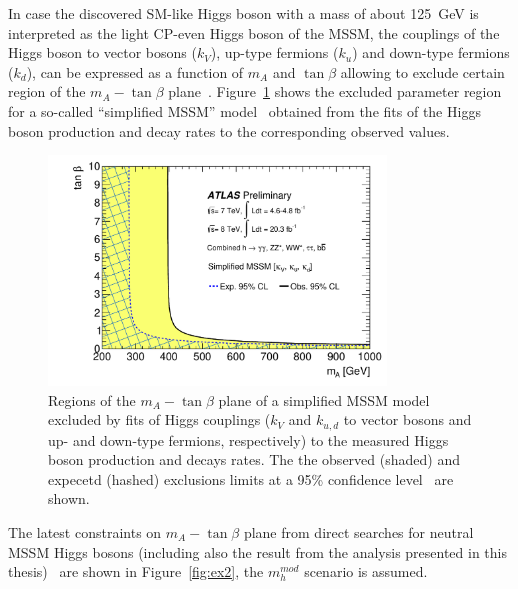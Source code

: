 In case the discovered SM-like Higgs boson with a mass of about 125~GeV is interpreted as the light CP-even Higgs boson of the MSSM, the couplings of the Higgs boson 
to vector bosons ($k_V$), up-type fermions ($k_u$) and down-type fermions ($k_d$), can be expressed as a function of  $m_A $ and $\tan\beta$
allowing to exclude certain region of the  $m_A - \tan\beta$ plane~\cite{AtlasConstraint}. Figure~\ref{fig:ex1} shows the 
excluded parameter region for a so-called ``simplified MSSM'' model~\cite{sympleMSSM1,sympleMSSM2}
obtained from the fits of the  Higgs boson production and decay rates to the corresponding observed values.

 
\begin{figure}[tp]
     \begin{center}

            \includegraphics[width=0.8\textwidth]{figure/limits/constraintAtlas.pdf}

    \end{center}
    \caption{Regions of the  $m_A - \tan\beta$ plane of a simplified MSSM model~\cite{sympleMSSM1,sympleMSSM2} 
	excluded by fits of Higgs couplings ($k_V$ and $k_{u,d}$ to vector bosons and up- and down-type fermions, respectively)
	to the measured  Higgs boson production and decays rates. The the observed (shaded) and expecetd (hashed)  exclusions 
	limits at a 95\% confidence level~\cite{AtlasConstraint} are shown.}

   \label{fig:ex1}
\end{figure}


The latest constraints on $m_A - \tan\beta$  plane from direct searches for neutral MSSM Higgs bosons (including 
also the result from the analysis presented in this thesis)~\cite{}  are  shown in Figure~\ref{fig:ex2}, the 
$m_h^{mod}$ scenario is assumed. 



